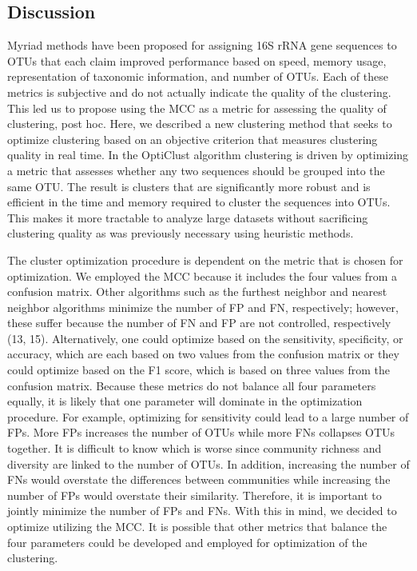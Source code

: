 \documentclass[11pt,]{article}
\begin{document}
\subsection{Discussion}\label{discussion}

Myriad methods have been proposed for assigning 16S rRNA gene sequences
to OTUs that each claim improved performance based on speed, memory
usage, representation of taxonomic information, and number of OTUs. Each
of these metrics is subjective and do not actually indicate the quality
of the clustering. This led us to propose using the MCC as a metric for
assessing the quality of clustering, post hoc. Here, we described a new
clustering method that seeks to optimize clustering based on an
objective criterion that measures clustering quality in real time. In
the OptiClust algorithm clustering is driven by optimizing a metric that
assesses whether any two sequences should be grouped into the same OTU.
The result is clusters that are significantly more robust and is
efficient in the time and memory required to cluster the sequences into
OTUs. This makes it more tractable to analyze large datasets without
sacrificing clustering quality as was previously necessary using
heuristic methods.

The cluster optimization procedure is dependent on the metric that is
chosen for optimization. We employed the MCC because it includes the
four values from a confusion matrix. Other algorithms such as the
furthest neighbor and nearest neighbor algorithms minimize the number of
FP and FN, respectively; however, these suffer because the number of FN
and FP are not controlled, respectively (13, 15). Alternatively, one
could optimize based on the sensitivity, specificity, or accuracy, which
are each based on two values from the confusion matrix or they could
optimize based on the F1 score, which is based on three values from the
confusion matrix. Because these metrics do not balance all four
parameters equally, it is likely that one parameter will dominate in the
optimization procedure. For example, optimizing for sensitivity could
lead to a large number of FPs. More FPs increases the number of OTUs
while more FNs collapses OTUs together. It is difficult to know which is
worse since community richness and diversity are linked to the number of
OTUs. In addition, increasing the number of FNs would overstate the
differences between communities while increasing the number of FPs would
overstate their similarity. Therefore, it is important to jointly
minimize the number of FPs and FNs. With this in mind, we decided to
optimize utilizing the MCC. It is possible that other metrics that
balance the four parameters could be developed and employed for
optimization of the clustering.
\end{document}
